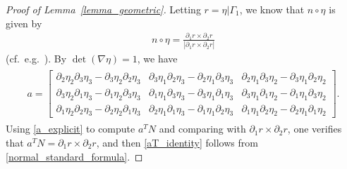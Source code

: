 \documentclass[10pt,reqno]{amsart}
\theoremstyle{plain}
\theoremstyle{definition}
\numberwithin{equation}{section}
\newcommand{\Ga}{\Gamma}
\newcommand{\srest}{\mathord{|}}
\begin{document}
\begin{proof}[Proof of Lemma~\ref{lemma_geometric}]
Letting $r = \eta \srest \Ga_1$, we know that $n \circ \eta$ is given by
\begin{gather}
n \circ \eta = \frac{\partial_1 r \times \partial_2 r}{|\partial_1 r \times \partial_2 r|}
\label{normal_standard_formula}
\end{gather}
(cf.~e.g.~\cite{HanIsometricEmbedding}).
By $\det(\nabla \eta) =1$, we have
\begin{align}
\begin{split}
a = 
\begin{bmatrix}
\partial_2 \eta_2 \partial_3 \eta_3 - \partial_3 \eta_2 \partial_2 \eta _3
& \partial_3 \eta_1 \partial_2 \eta_3 - \partial_2 \eta_1 \partial_3 \eta_3
&
\partial_2 \eta_1 \partial_3 \eta_2 - \partial_3 \eta_1 \partial_2 \eta_2
\\
\partial_3 \eta_2 \partial_1 \eta_3 - \partial_1 \eta_2 \partial_3 \eta_3
&
\partial_1 \eta_1 \partial_3 \eta_3 - \partial_3 \eta_1 \partial_1 \eta _3 
&
\partial_3 \eta_1 \partial_1 \eta_2 - \partial_1 \eta_1 \partial_3 \eta_2
\\
\partial_1 \eta_2 \partial_2 \eta_3 - \partial_2 \eta_2 \partial_1 \eta_3
&
\partial_2 \eta_1 \partial_1 \eta_3 - \partial_1 \eta_1 \partial_2 \eta _3 
&
\partial_1 \eta_1 \partial_2 \eta_2 - \partial_2 \eta_1 \partial_1 \eta_2
\end{bmatrix}.
\end{split}
\label{a_explicit}
\end{align}
Using \eqref{a_explicit} to compute $a^T N$ and comparing with 
 $\partial_1 r \times \partial_2 r$, one verifies that  
$
a^T N = \partial_1 r \times \partial_2 r
$,
and then \eqref{aT_identity} follows from \eqref{normal_standard_formula}.


\end{proof}
\end{document}
